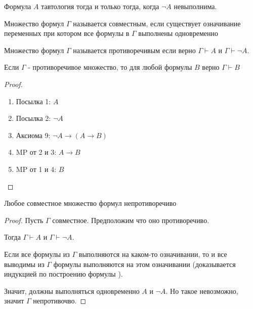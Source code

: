 \begin{consequence} \thmslashn

    Формула $A$ тавтология тогда и только тогда, когда $\neg A$ невыполнима. 
\end{consequence}
\begin{definition} \thmslashn 

    Множество формул $\Gamma$ называется совместным, если существует означивание переменных при котором все формулы в $\Gamma$ выполнены одновременно
\end{definition}
\begin{definition} \thmslashn 

    Множество формул $\Gamma$ называется противоречивым если верно $\Gamma \vdash A$ и $\Gamma \vdash \neg A$.
\end{definition}
\begin{consequence} \thmslashn

    Если $\Gamma$ - противоречивое множество, то для любой формулы $B$ верно $\Gamma \vdash B$
    \begin{proof} \thmslashn
    
        \begin{enumerate}
            \item Посылка 1: $A$
            \item Посылка 2: $\neg A$
            \item Аксиома 9: $\neg A \to (A \to B)$
            \item MP от 2 и 3: $A \to B$
            \item MP от 1 и 4: $B$ \qedhere
        \end{enumerate}
    \end{proof}
\end{consequence}
\begin{theorem} \thmslashn

    Любое совместное множество формул непротиворечиво

    \begin{proof} \thmslashn
    
        Пусть $\Gamma$ совместное. Предположим что оно противоречиво.

        Тогда $\Gamma \vdash A$ и $\Gamma \vdash \neg A$.

        Если все формулы из $\Gamma$ выполняются на каком-то означивании, то и все выводимы из $\Gamma$ формулы выполняются на этом означивании (доказывается индукцией по построению формулы ).

        Значит, должны выполняться одновременно $A$ и $\neg A$. Но такое невозможно, значит $\Gamma$ непротивочво.
    \end{proof}
\end{theorem}
